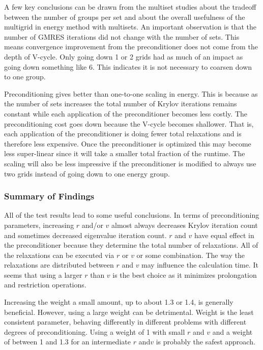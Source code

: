 A few key conclusions can be drawn from the multiset studies about the tradeoff between the number of groups per set and about the overall usefulness of the multigrid in energy method with multisets. An important observation is that the number of GMRES iterations did not change with the number of sets. This means convergence improvement from the preconditioner does not come from the depth of V-cycle. Only going down 1 or 2 grids had as much of an impact as going down something like 6. This indicates it is not necessary to coarsen down to one group. 

Preconditioning gives better than one-to-one scaling in energy. This is because as the number of sets increases the total number of Krylov iterations remains constant while each application of the preconditioner becomes less costly. The preconditioning cost goes down because the V-cycle becomes shallower. That is, each application of the preconditioner is doing fewer total relaxations and is therefore less expensive. Once the preconditioner is optimized this may become less super-linear since it will take a smaller total fraction of the runtime. The scaling will also be less impressive if the preconditioner is modified to always use two grids instead of going down to one energy group. 

\subsubsection{Summary of Findings}
All of the test results lead to some useful conclusions. In terms of preconditioning parameters, increasing $r$ and/or $v$ almost always decreases Krylov iteration count and sometimes decreased eigenvalue iteration count. $r$ and $v$ have equal effect in the preconditioner because they determine the total number of relaxations. All of the relaxations can be executed via $r$ or $v$ or some combination. The way the relaxations are distributed between $r$ and $v$ may influence the calculation time. It seems that using a larger $r$ than $v$ is the best choice as it minimizes prolongation and restriction operations. 
 
Increasing the weight a small amount, up to about 1.3 or 1.4, is generally beneficial. However, using a large weight can be detrimental. Weight is the least consistent parameter, behaving differently in different problems with different degrees of preconditioning. Using a weight of 1 with small $r$ and $v$ and a weight of between 1 and 1.3 for an intermediate $r$ and$v$ is probably the safest approach. 


